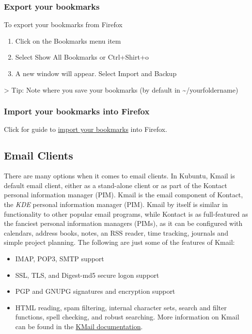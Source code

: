 \documentclass[letterpaper,10pt,english]{sphinxmanual}
\begin{document}
\subsubsection{Export your bookmarks}
\label{docs/software:export-your-bookmarks}
To export your bookmarks from Firefox
\begin{enumerate}
\item {} 
Click on the Bookmarks menu item

\item {} 
Select Show All Bookmarks or Ctrl+Shirt+o

\item {} 
A new window will appear. Select Import and Backup

\end{enumerate}

\textgreater{} Tip: Note where you save your bookmarks (by default in \textasciitilde{}/yourfoldername)


\subsubsection{Import your bookmarks into Firefox}
\label{docs/software:import-your-bookmarks-into-firefox}
Click for guide to \href{https://support.mozilla.org/en-US/kb/import-bookmarks-html-file}{import your bookmarks} into Firefox.


\subsection{Email Clients}
\label{docs/software:email-clients}
There are many options when it comes to email clients. In Kubuntu, Kmail is default email client, either as a stand-alone client or as part of the Kontact personal information manager (PIM). Kmail is the email component of Kontact, the \emph{KDE} personal information manager (PIM). Kmail by itself is similar in functionality to other popular email programs, while Kontact is as full-featured as the fanciest personal information managers (PIMs), as it can be configured with calendars, address books, notes, an RSS reader, time tracking, journals and simple project planning. The following are just some of the features of Kmail:
\begin{itemize}
\item {} 
IMAP, POP3, SMTP support

\item {} 
SSL, TLS, and Digest-md5 secure logon support

\item {} 
PGP and GNUPG signatures and encryption support

\item {} 
HTML reading, spam filtering, internal character sets, search and filter functions, spell checking, and robust searching. More information on Kmail can be found in the \href{https://userbase.kde.org/Special:MyLanguage/KMail}{KMail documentation}.

\end{itemize}
\end{document}
